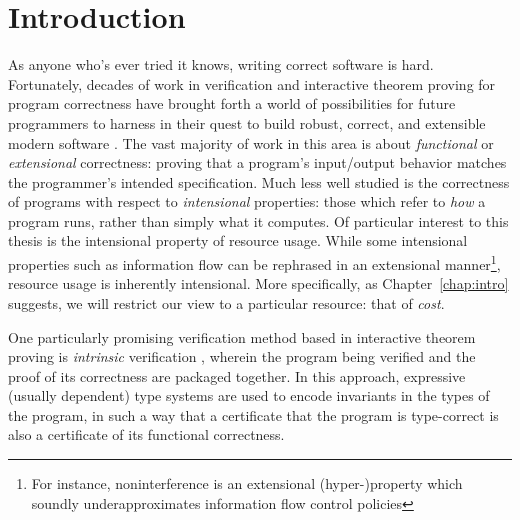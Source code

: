 \section{Introduction}
As anyone who's ever tried it knows, writing correct software is hard. Fortunately, decades of work in verification and interactive theorem proving for program correctness have brought forth a world of possibilities for future programmers to harness in their quest to build robust, correct, and extensible modern software \citehere. The vast majority of work in this area is about \textit{functional} or \textit{extensional} correctness: proving that a program's input/output behavior matches the programmer's intended specification. Much less well studied is the correctness of programs with respect to \textit{intensional} properties: those which refer to \textit{how} a program runs, rather than simply what it computes. Of particular interest to this thesis is the intensional property of resource usage. While some intensional properties such as information flow can be rephrased in an extensional manner\footnote{For instance, noninterference \citehere is an extensional (hyper-)property which soundly underapproximates information flow control policies}, resource usage is inherently intensional. More specifically, as Chapter~\ref{chap:intro} suggests, we will restrict our view to a particular resource: that of \textit{cost}.

One particularly promising verification method based in interactive theorem proving is \textit{intrinsic} verification \citehere, wherein the program being verified and the proof of its correctness are packaged together. In this approach, expressive (usually dependent) type systems are used to encode invariants in the types of the program, in such a way that a certificate that the program is type-correct is also a certificate of its functional correctness.

